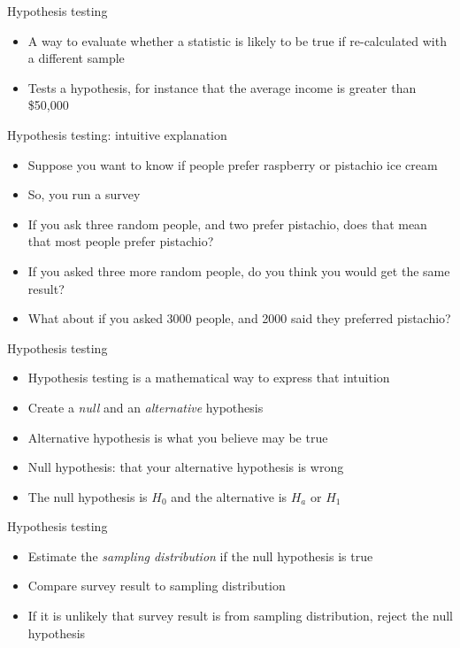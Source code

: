 
\begin{frame}{Hypothesis testing}
  \begin{itemize}
    \item A way to evaluate whether a statistic is likely to be true if re-calculated with a different sample
    \item Tests a hypothesis, for instance that the average income is greater than \$50,000
  \end{itemize}
\end{frame}

\begin{frame}{Hypothesis testing: intuitive explanation}
  \begin{itemize}
    \item Suppose you want to know if people prefer raspberry or pistachio ice cream
    \item So, you run a survey
    \item If you ask three random people, and two prefer pistachio, does that mean that most people prefer pistachio?
    \pause\item If you asked three more random people, do you think you would get the same result?
    \pause\item What about if you asked 3000 people, and 2000 said they preferred pistachio?
  \end{itemize}
\end{frame}

\begin{frame}{Hypothesis testing}
  \begin{itemize}
    \item Hypothesis testing is a mathematical way to express that intuition
    \item Create a \emph{null} and an \emph{alternative} hypothesis
    \item Alternative hypothesis is what you believe may be true
    \item Null hypothesis: that your alternative hypothesis is wrong
    \item The null hypothesis is $H_0$ and the alternative is $H_a$ or $H_1$
  \end{itemize}
\end{frame}

\begin{frame}{Hypothesis testing}
  \begin{itemize}
    \item Estimate the \emph{sampling distribution} if the null hypothesis is true
    \item Compare survey result to sampling distribution
    \item If it is unlikely that survey result is from sampling distribution, reject the null hypothesis
  \end{itemize}
\end{frame}

